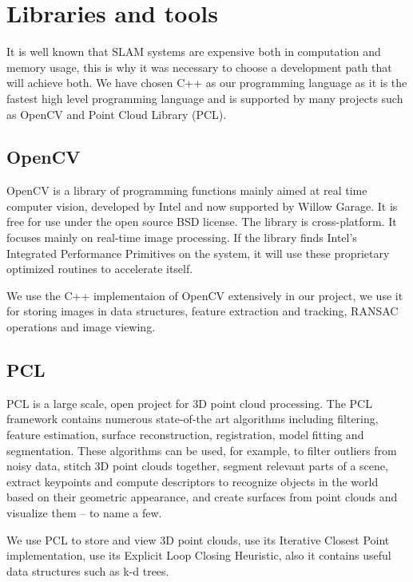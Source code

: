 \section{Libraries and tools}

It is well known that SLAM systems are expensive both in computation and memory usage, this is why it was necessary to choose a development path that will achieve both. We have chosen C++ as our programming language as it is the fastest high level programming language and is supported by many projects such as OpenCV and Point Cloud Library (PCL).

\subsection{OpenCV}

OpenCV is a library of programming functions mainly aimed at real time computer vision, developed by Intel and now supported by Willow Garage. It is free for use under the open source BSD license. The library is cross-platform. It focuses mainly on real-time image processing. If the library finds Intel's Integrated Performance Primitives on the system, it will use these proprietary optimized routines to accelerate itself.

We use the C++ implementaion of OpenCV extensively in our project, we use it for storing images in data structures, feature extraction and tracking, RANSAC operations and image viewing.

\subsection{PCL}

PCL is a large scale, open project for 3D point cloud processing. The PCL framework contains numerous state-of-the art algorithms including filtering, feature estimation, surface reconstruction, registration, model fitting and segmentation. These algorithms can be used, for example, to filter outliers from noisy data, stitch 3D point clouds together, segment relevant parts of a scene, extract keypoints and compute descriptors to recognize objects in the world based on their geometric appearance, and create surfaces from point clouds and visualize them -- to name a few.

We use PCL to store and view 3D point clouds, use its Iterative Closest Point implementation, use its Explicit Loop Closing Heuristic, also it contains useful data structures such as k-d trees.
